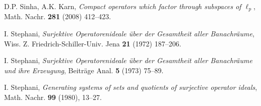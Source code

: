 \documentclass[a4paper,11pt]{amsart}
\theoremstyle{definition}
\theoremstyle{definition}
\theoremstyle{definition}
\begin{document}
\begin{thebibliography}{DFJP}
 D.P. Sinha, A.K. Karn, {\em Compact operators which factor through subspaces of $\ell_p$}, Math. Nachr. {\bf 281} (2008) 412--423.

 I. Stephani, {\em Surjektive Operatorenideale {\"u}ber der Gesamtheit aller Banachr{\"a}ume}, Wiss. Z. Friedrich-Schiller-Univ. Jena {\bf 21} (1972) 187--206.

 I. Stephani, {\em Surjektive Operatorenideale {\"u}ber der Gesamtheit aller Banachr{\"a}ume und ihre Erzeugung}, Beitr{\"a}ge Anal. {\bf 5} (1973) 75--89.

 I. Stephani, {\em Generating systems of sets and quotients of surjective operator ideals}, Math. Nachr.  {\bf 99}  (1980), 13--27.

\end{thebibliography}
\end{document}
